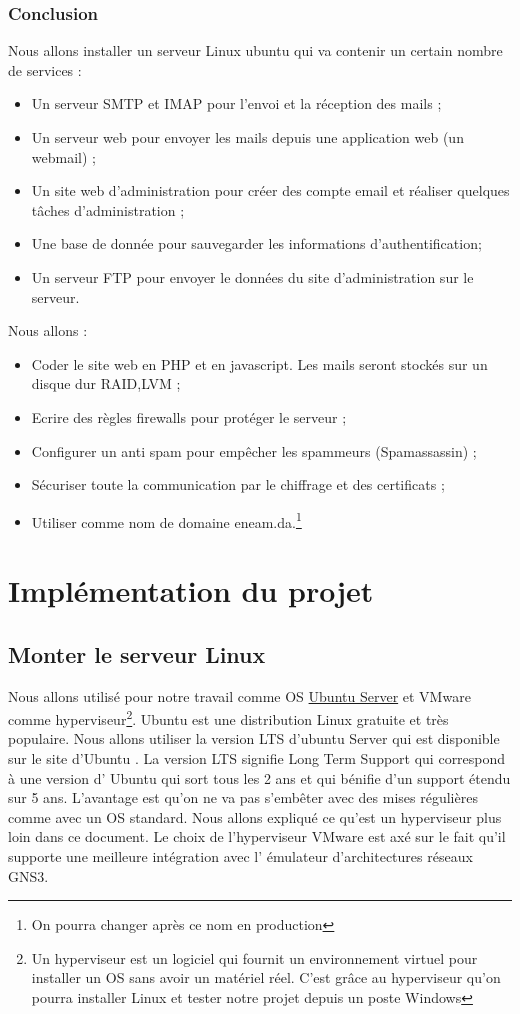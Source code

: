 \documentclass[a4paper,12pt,french]{report} %
\begin{document}
\subsection*{Conclusion}
Nous allons installer un serveur Linux ubuntu qui va contenir un certain nombre de services :
\begin{itemize}
	\item  Un serveur SMTP et IMAP pour l'envoi et la réception des mails ;
	\item  Un serveur web pour envoyer les mails depuis une application web (un webmail) ;
	\item  Un site web d'administration pour créer des compte email et réaliser quelques tâches d'administration ;
	\item Une base de donnée pour sauvegarder les informations d'authentification; 
	\item Un serveur FTP pour envoyer le données du site d'administration sur le serveur.
\end{itemize}
Nous allons :
\begin{itemize}
	\item Coder le site web en PHP et en javascript. Les mails seront stockés sur un disque dur RAID\label{ref:raid},LVM\label{ref:lvm} ;
	\item Ecrire des règles firewalls pour protéger le serveur ;
	\item  Configurer un anti spam pour empêcher les spammeurs (Spamassassin) ;
	\item Sécuriser toute la communication par le chiffrage et des certificats ;
	\item Utiliser comme nom de domaine eneam.da.\footnote{On pourra changer après ce nom en production}
\end{itemize}

\chapter{Implémentation du projet}

\section{Monter le serveur Linux}
Nous allons utilisé pour notre travail comme OS \href{https://ubuntu-fr.org/telechargement?variante=server}{Ubuntu Server} et VMware comme hyperviseur\footnote{Un hyperviseur est un logiciel qui fournit un environnement virtuel pour installer un OS sans avoir un matériel réel. C'est grâce au hyperviseur qu'on pourra installer Linux et tester notre projet depuis un poste Windows}. Ubuntu est une distribution Linux gratuite et très populaire. Nous allons utiliser la version  LTS d'ubuntu Server qui est disponible sur le site d'Ubuntu . La version LTS signifie Long Term Support qui correspond à une version d' Ubuntu qui sort tous les 2 ans et qui bénifie d'un support étendu sur 5 ans. L'avantage est qu'on ne va pas s'embêter avec des mises régulières comme avec un OS standard. Nous allons expliqué ce qu'est un hyperviseur plus loin dans ce document. Le choix de l'hyperviseur VMware est axé sur le fait qu'il supporte une meilleure intégration avec l' émulateur d'architectures réseaux GNS3.%
\end{document}
